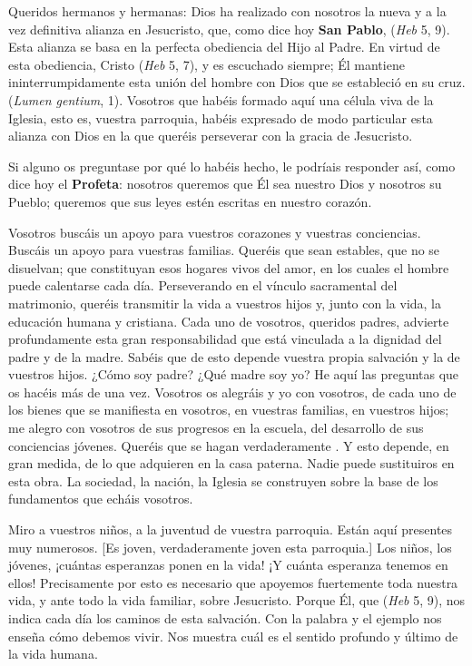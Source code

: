 \begin{body}
Queridos hermanos y hermanas: Dios ha realizado con nosotros la nueva y a la vez definitiva alianza en Jesucristo, que, como dice hoy \textbf{San Pablo},  (\textit{Heb} 5, 9). Esta alianza se basa en la perfecta obediencia del Hijo al Padre. En virtud de esta obediencia, Cristo  (\textit{Heb} 5, 7), y es escuchado siempre; Él mantiene ininterrumpidamente esta unión del hombre con Dios que se estableció en su cruz.  (\textit{Lumen gentium}, 1). Vosotros que habéis formado aquí una célula viva de la Iglesia, esto es, vuestra parroquia, habéis expresado de modo particular esta alianza con Dios en la que queréis perseverar con la gracia de Jesucristo.

Si alguno os preguntase por qué lo habéis hecho, le podríais responder así, como dice hoy el \textbf{Profeta}: nosotros queremos que Él sea nuestro Dios y nosotros su Pueblo; queremos que sus leyes estén escritas en nuestro corazón.

Vosotros buscáis un apoyo para vuestros corazones y vuestras conciencias. Buscáis un apoyo para vuestras familias. Queréis que sean estables, que no se disuelvan; que constituyan esos hogares vivos del amor, en los cuales el hombre puede calentarse cada día. Perseverando en el vínculo sacramental del matrimonio, queréis transmitir la vida a vuestros hijos y, junto con la vida, la educación humana y cristiana. Cada uno de vosotros, queridos padres, advierte profundamente esta gran responsabilidad que está vinculada a la dignidad del padre y de la madre. Sabéis que de esto depende vuestra propia salvación y la de vuestros hijos. ¿Cómo soy padre? ¿Qué madre soy yo? He aquí las preguntas que os hacéis más de una vez. Vosotros os alegráis y yo con vosotros, de cada uno de los bienes que se manifiesta en vosotros, en vuestras familias, en vuestros hijos; me alegro con vosotros de sus progresos en la escuela, del desarrollo de sus conciencias jóvenes. Queréis que se hagan verdaderamente . Y esto depende, en gran medida, de lo que adquieren en la casa paterna. Nadie puede sustituiros en esta obra. La sociedad, la nación, la Iglesia se construyen sobre la base de los fundamentos que echáis vosotros.


\newpage 
Miro a vuestros niños, a la juventud de vuestra parroquia. Están aquí presentes muy numerosos. [Es joven, verdaderamente joven esta parroquia.] Los niños, los jóvenes, ¡cuántas esperanzas ponen en la vida! ¡Y cuánta esperanza tenemos en ellos! Precisamente por esto es necesario que apoyemos fuertemente toda nuestra vida, y ante todo la vida familiar, sobre Jesucristo. Porque Él, que  (\textit{Heb} 5, 9), nos indica cada día los caminos de esta salvación. Con la palabra y el ejemplo nos enseña cómo debemos vivir. Nos muestra cuál es el sentido profundo y último de la vida humana.


\end{body}
